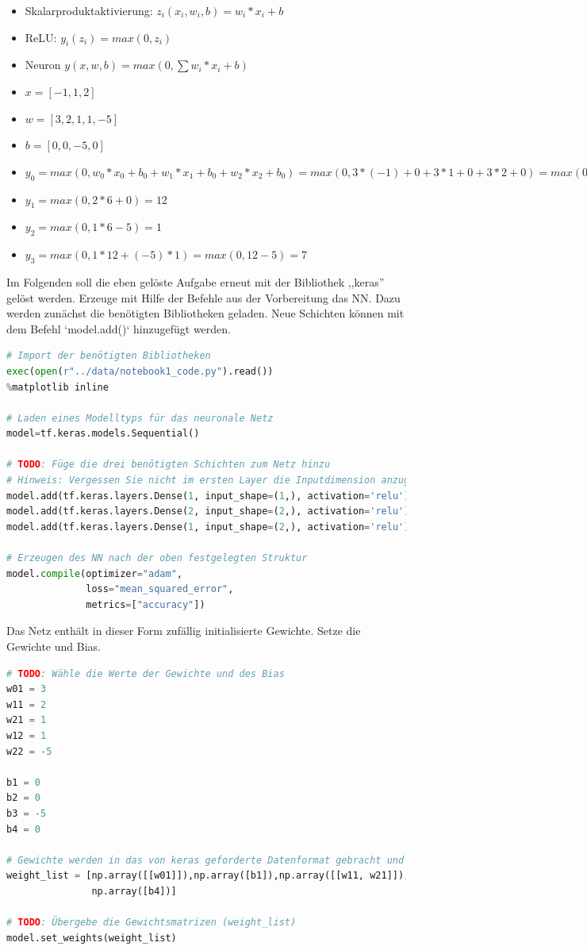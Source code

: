 \documentclass[a4paper,10pt,titlepage]{scrartcl}
\begin{document}
\begin{itemize}
    \item Skalarproduktaktivierung: $z_i(x_i, w_i, b)=w_i *x_i+b$
    \item ReLU: $y_i (z_i)=max(0,z_i)$
    \item Neuron $y(x,w,b)=max(0,\sum w_i*x_i+b)$
    \item $x=[-1,1,2]$
    \item $w=[3,2,1,1,-5]$
    \item $b=[0,0,-5,0]$
    \item $y_0=max(0, w_0*x_0+b_0 + w_1*x_1+b_0 + w_2*x_2+b_0) = max(0, 3*(-1)+0 +3*1+0 + 3*2+0) = max(0,-3+3+6)=6$
    \item $y_1=max(0, 2*6+0)=12$
    \item $y_2=max(0, 1*6-5)=1$
    \item $y_3=max(0, 1*12 + (-5)*1)=max(0, 12-5)=7$
\end{itemize}

Im Folgenden soll die eben gelöste Aufgabe erneut mit der Bibliothek ,,keras'' gelöst werden. Erzeuge mit Hilfe der Befehle aus der Vorbereitung das NN. Dazu werden zunächst die benötigten Bibliotheken geladen. Neue Schichten können mit dem Befehl `model.add()` hinzugefügt werden.

\begin{lstlisting}[language=python]
# Import der benötigten Bibliotheken 
exec(open(r"../data/notebook1_code.py").read())
%matplotlib inline

# Laden eines Modelltyps für das neuronale Netz
model=tf.keras.models.Sequential()

# TODO: Füge die drei benötigten Schichten zum Netz hinzu
# Hinweis: Vergessen Sie nicht im ersten Layer die Inputdimension anzugeben
model.add(tf.keras.layers.Dense(1, input_shape=(1,), activation='relu'))
model.add(tf.keras.layers.Dense(2, input_shape=(2,), activation='relu'))
model.add(tf.keras.layers.Dense(1, input_shape=(2,), activation='relu'))

# Erzeugen des NN nach der oben festgelegten Struktur
model.compile(optimizer="adam",
              loss="mean_squared_error",
              metrics=["accuracy"])
\end{lstlisting}

Das Netz enthält in dieser Form zufällig initialisierte Gewichte. Setze die Gewichte und Bias.

\begin{lstlisting}[language=python]
# TODO: Wähle die Werte der Gewichte und des Bias
w01 = 3
w11 = 2
w21 = 1
w12 = 1
w22 = -5

b1 = 0
b2 = 0
b3 = -5
b4 = 0

# Gewichte werden in das von keras geforderte Datenformat gebracht und in weight_list gespeichert
weight_list = [np.array([[w01]]),np.array([b1]),np.array([[w11, w21]]),np.array([b2, b3]),np.array([[w12], [w22]]),
               np.array([b4])]

# TODO: Übergebe die Gewichtsmatrizen (weight_list)
model.set_weights(weight_list)

\end{lstlisting}
\end{document}
